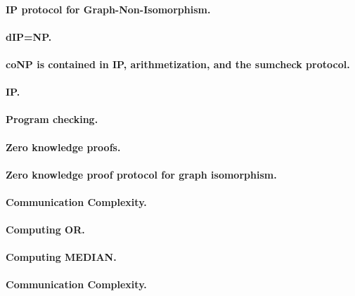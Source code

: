 \documentclass[11pt,a4paper]{article}
\theoremstyle{definition}
\begin{document}
\paragraph{IP protocol for Graph-Non-Isomorphism.}

\paragraph{dIP=NP.}

\paragraph{coNP is contained in IP, arithmetization, and the sumcheck protocol.}

\paragraph{IP.}

\paragraph{Program checking.}

\paragraph{Zero knowledge proofs.}

\paragraph{Zero knowledge proof protocol for graph isomorphism.}

\paragraph{Communication Complexity.}

\paragraph{Computing OR.}

\paragraph{Computing MEDIAN.}

\paragraph{Communication Complexity.}
\end{document}
